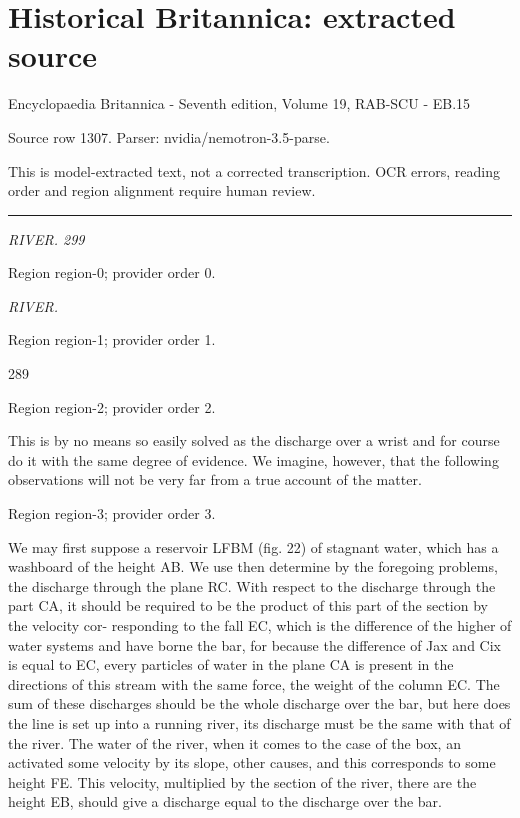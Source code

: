 \documentclass[11pt]{article}
\begin{document}
\section*{Historical Britannica: extracted source}
Encyclopaedia Britannica - Seventh edition, Volume 19, RAB-SCU - EB.15\par
{\small Source row 1307. Parser: nvidia/nemotron-3.5-parse.\par}
{\small This is model-extracted text, not a corrected transcription. OCR errors, reading order and region alignment require human review.\par}
\hrule\medskip
{\small\itshape RIVER. 299\par}

{\scriptsize\color{gray} Region region-0; provider order 0.\par}
\medskip

{\small\itshape RIVER.\par}

{\scriptsize\color{gray} Region region-1; provider order 1.\par}
\medskip

289
\par

{\scriptsize\color{gray} Region region-2; provider order 2.\par}
\medskip

This is by no means so easily solved as the discharge over a wrist and for course do it with the same degree of evidence. We imagine, however, that the following observations will not be very far from a true account of the matter.
\par

{\scriptsize\color{gray} Region region-3; provider order 3.\par}
\medskip

We may first suppose a reservoir LFBM (fig. 22) of stagnant water, which has a washboard of the height AB. We use then determine by the foregoing problems, the discharge through the plane RC. With respect to the discharge through the part CA, it should be required to be the product of this part of the section by the velocity cor- responding to the fall EC, which is the difference of the higher of water systems and have borne the bar, for because the difference of Jax and Cix is equal to EC, every particles of water in the plane CA is present in the directions of this stream with the same force, the weight of the column EC. The sum of these discharges should be the whole discharge over the bar, but here does the line is set up into a running river, its discharge must be the same with that of the river. The water of the river, when it comes to the case of the box, an activated some velocity by its slope, other causes, and this corresponds to some height FE. This velocity, multiplied by the section of the river, there are the height EB, should give a discharge equal to the discharge over the bar.
\par
\end{document}

